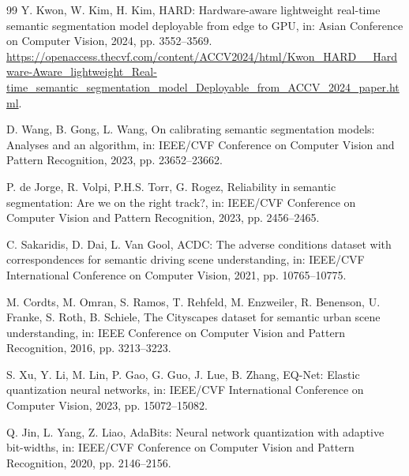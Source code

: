 \documentclass[a4paper,review,12pt]{elsarticle}
\begin{document}
\begin{thebibliography}{99}
Y. Kwon, W. Kim, H. Kim,
HARD: Hardware-aware lightweight real-time semantic segmentation model deployable from edge to GPU,
in: Asian Conference on Computer Vision, 2024, pp. 3552--3569.
\url{https://openaccess.thecvf.com/content/ACCV2024/html/Kwon_HARD__Hardware-Aware_lightweight_Real-time_semantic_segmentation_model_Deployable_from_ACCV_2024_paper.html}.

D. Wang, B. Gong, L. Wang,
On calibrating semantic segmentation models: Analyses and an algorithm,
in: IEEE/CVF Conference on Computer Vision and Pattern Recognition, 2023, pp. 23652--23662.

P. de Jorge, R. Volpi, P.H.S. Torr, G. Rogez,
Reliability in semantic segmentation: Are we on the right track?,
in: IEEE/CVF Conference on Computer Vision and Pattern Recognition, 2023, pp. 2456--2465.

C. Sakaridis, D. Dai, L. Van Gool,
ACDC: The adverse conditions dataset with correspondences for semantic driving scene understanding,
in: IEEE/CVF International Conference on Computer Vision, 2021, pp. 10765--10775.

M. Cordts, M. Omran, S. Ramos, T. Rehfeld, M. Enzweiler, R. Benenson, U. Franke, S. Roth, B. Schiele,
The Cityscapes dataset for semantic urban scene understanding,
in: IEEE Conference on Computer Vision and Pattern Recognition, 2016, pp. 3213--3223.

S. Xu, Y. Li, M. Lin, P. Gao, G. Guo, J. Lue, B. Zhang,
EQ-Net: Elastic quantization neural networks,
in: IEEE/CVF International Conference on Computer Vision, 2023, pp. 15072--15082.

Q. Jin, L. Yang, Z. Liao,
AdaBits: Neural network quantization with adaptive bit-widths,
in: IEEE/CVF Conference on Computer Vision and Pattern Recognition, 2020, pp. 2146--2156.

\end{thebibliography}
\end{document}
